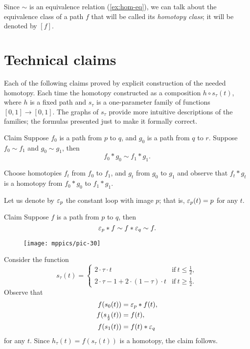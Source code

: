 Since $\sim$ is an equivalence relation (\ref{ex:hom-eq}), we can talk about the equivalence class of a path $f$ that will be called its \emph{homotopy class};
it will be denoted by $[f]$.



\section{Technical claims}\label{sec:homotopy-claim}

Each of the following claims proved by explicit construction of the needed homotopy.
Each time the homotopy constructed as a composition $h\circ s_\tau(t)$, where $h$ is a fixed path and  $s_\tau$ is a one-parameter family of functions $[0,1]\to [0,1]$.
The graphs of $s_\tau$ provide more intuitive descriptions of the families;
the formulas presented just to make it formally correct.

\begin{thm}{Claim}\label{clm:product}
Suppose $f_0$ is a path from $p$ to $q$,
and 
$g_0$ is a path from $q$ to $r$.
Suppose $f_0\sim f_1$ and $g_0\sim g_1$,
then
\[f_0*g_0\sim f_1*g_1.\]
\end{thm}

Choose homotopies $f_t$ from $f_0$ to $f_1$, and $g_t$ from $g_0$ to $g_1$ and observe that 
$f_t*g_t$ is a homotopy from $f_0*g_0$ to $f_1*g_1$.
\qeds

Let us denote by $\varepsilon_p$ the constant loop with image $p$;
that is, $\varepsilon_p(t)=p$ for any $t$.

\begin{thm}{Claim}\label{clm:neutral}
Suppose $f$ is a path from $p$ to $q$, then
\[\varepsilon_p*f\sim f*\varepsilon_q\sim  f.\]
\end{thm}

\begin{wrapfigure}[4]{r}{30mm}
\centering
\vskip-5mm
\texttt{[image: mppics/pic-30]}
\end{wrapfigure}

Consider the function
\[s_\tau(t)=
\begin{cases}
2\cdot \tau \cdot t&\text{if}\ t\le \tfrac12,
\\
2\cdot\tau-1+2\cdot (1-\tau) \cdot t&\text{if}\ t\ge \tfrac12.
\end{cases}
\]
Observe that 
\begin{align*}
f(s_0(t))&=\varepsilon_p*f(t),
\\
f(s_{\frac12}(t))&=f(t),
\\
f(s_1(t))&=f(t)*\varepsilon_q
\end{align*}
for any $t$.
Since $h_\tau(t)=f(s_\tau(t))$ is a homotopy, the claim follows.
\qeds

